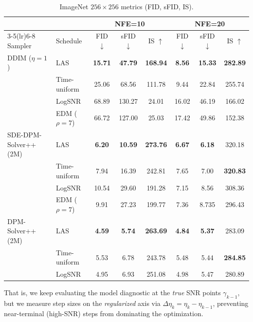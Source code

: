 \documentclass[11pt]{article}
\def\times{×}%
\theoremstyle{definition}
\numberwithin{equation}{section}
\begin{document}
\begin{table}[t!]
\centering
\caption{ImageNet $256\times256$ metrics (FID, sFID, IS).}
\label{tab:imagenet_metrics}
\setlength{\tabcolsep}{4pt}
\begin{tabular}{l l ccc ccc}
\toprule
& & \multicolumn{3}{c}{NFE=10} & \multicolumn{3}{c}{NFE=20} \\
\cmidrule(lr){3-5}\cmidrule(lr){6-8}
Sampler & Schedule & FID $\downarrow$ & sFID $\downarrow$ & IS $\uparrow$ & FID $\downarrow$ & sFID $\downarrow$ & IS $\uparrow$ \\
\midrule
DDIM ($\eta=1$) & LAS              & \textbf{15.71} & \textbf{47.79} & \textbf{168.94} & \textbf{8.56}  & \textbf{15.33} & \textbf{282.89} \\
                &Time-uniform    & 25.06 & 68.56 & 111.78 & 9.44  & 22.84 & 255.74 \\ 
                & LogSNR           & 68.89 & 130.27 & 24.01 & 16.02 & 46.19 & 166.02 \\ 
                & EDM ($\rho = 7$) & 66.72 & 127.00 & 25.03 & 17.42 & 49.86 & 152.38\\ 
\midrule
SDE-DPM-Solver++ (2M)   & LAS              & \textbf{6.20}  & \textbf{10.59} & \textbf{273.76} & \textbf{6.67}  &\textbf{6.18} & 320.18 \\
                & Time-uniform      & 7.94  & 16.39 & 242.81 & 7.65  & 7.00 & \textbf{320.83} \\
                & LogSNR           & 10.54 & 29.60 & 191.28 & 7.15  & 8.56 & 308.36 \\ 
                & EDM ($\rho = 7$) & 9.91  & 27.23 & 199.77 & 7.36  & 8.735 & 296.43 \\ 
\midrule
DPM-Solver++ (2M)  & LAS         & \textbf{4.59}  & \textbf{5.74} & \textbf{263.69} & \textbf{4.84} & \textbf{5.37} & 283.09 \\
            & Time-uniform & 5.53  & 6.78 & 243.78  & 5.48 & 5.44 & \textbf{284.85} \\
            & LogSNR      & 4.95  & 6.93 & 251.08  & 4.98 & 5.47 & 280.89 \\
\bottomrule
\end{tabular}
\end{table}




That is, we keep evaluating the model diagnostic at the \emph{true} SNR points $\gamma_{k-1}$, but we measure step
sizes on the \emph{regularized} axis via $\Delta\eta_k=\eta_k-\eta_{k-1}$, preventing near-terminal (high-SNR)
steps from dominating the optimization.
\end{document}
